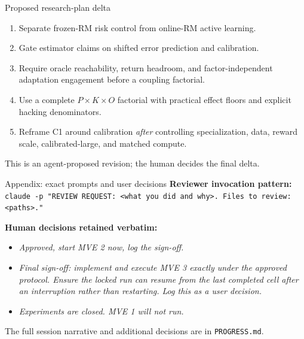 \documentclass[aspectratio=169,10pt]{beamer}
\begin{document}
\begin{frame}{Proposed research-plan delta}
\begin{enumerate}
  \item Separate frozen-RM risk control from online-RM active learning.
  \item Gate estimator claims on shifted error prediction and calibration.
  \item Require oracle reachability, return headroom, and factor-independent adaptation engagement before a coupling factorial.
  \item Use a complete $P\times K\times O$ factorial with practical effect floors and explicit hacking denominators.
  \item Reframe C1 around calibration \emph{after} controlling specialization, data, reward scale, calibrated-large, and matched compute.
\end{enumerate}
This is an agent-proposed revision; the human decides the final delta.
\end{frame}



\appendix
\begin{frame}{Appendix: exact prompts and user decisions}
\scriptsize
\textbf{Reviewer invocation pattern:}\\
\texttt{claude -p "REVIEW REQUEST: <what you did and why>. Files to review: <paths>."}

\vspace{0.5em}
\textbf{Human decisions retained verbatim:}
\begin{itemize}
  \item \textit{Approved, start MVE 2 now, log the sign-off.}
  \item \textit{Final sign-off: implement and execute MVE 3 exactly under the approved protocol. Ensure the locked run can resume from the last completed cell after an interruption rather than restarting. Log this as a user decision.}
  \item \textit{Experiments are closed. MVE 1 will not run.}
\end{itemize}
The full session narrative and additional decisions are in \texttt{PROGRESS.md}.
\end{frame}
\end{document}
